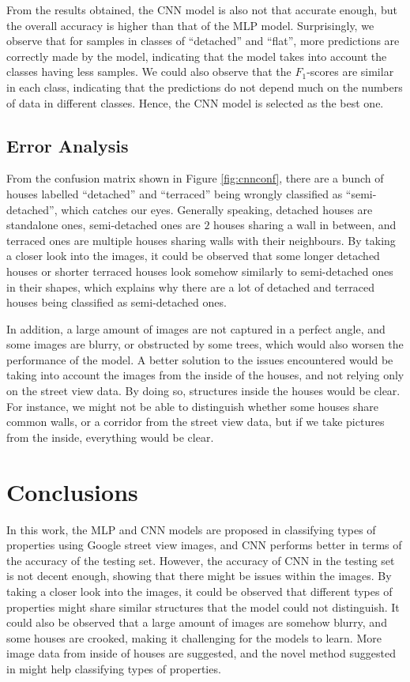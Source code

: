 \documentclass[11pt,twoside]{article}
\numberwithin{Theorem}{section}
\numberwithin{Definition}{section}
\numberwithin{Lemma}{section}
\numberwithin{Algorithm}{section}
\numberwithin{equation}{section}
\begin{document}
From the results obtained, the CNN model is also not that accurate enough, but the overall accuracy is higher than that of the MLP model. Surprisingly, we observe that for samples in classes of  “detached” and  “flat”, more predictions are correctly made by the model, indicating that the model takes into account the classes having less samples. We could also observe that the $F_1$-scores are similar in each class, indicating that the predictions do not depend much on the numbers of data in different classes. Hence, the CNN model is selected as the best one.

\subsection{Error Analysis}
From the confusion matrix shown in Figure \ref{fig:cnnconf}, there are a bunch of houses labelled “detached” and “terraced” being wrongly classified as “semi-detached”, which catches our eyes. Generally speaking, detached houses are standalone ones, semi-detached ones are $2$ houses sharing a wall in between, and terraced ones are multiple houses sharing walls with their neighbours. By taking a closer look into the images, it could be observed that some longer detached houses or shorter terraced houses look somehow similarly to semi-detached ones in their shapes, which explains why there are a lot of detached and terraced houses being classified as semi-detached ones. 

In addition, a large amount of images are not captured in a perfect angle, and some images are blurry, or obstructed by some trees, which would also worsen the performance of the model. A better solution to the issues encountered would be taking into account the images from the inside of the houses, and not relying only on the street view data. By doing so, structures inside the houses would be clear. For instance, we might not be able to distinguish whether some houses share common walls, or a corridor from the street view data, but if we take pictures from the inside, everything would be clear.

\section{Conclusions}
In this work, the MLP and CNN models are proposed in classifying types of properties using Google street view images, and CNN performs better in terms of the accuracy of the testing set. However, the accuracy of CNN in the testing set is not decent enough, showing that there might be issues within the images. By taking a closer look into the images, it could be observed that different types of properties might share similar structures that the model could not distinguish. It could also be observed that a large amount of images are somehow blurry, and some houses are crooked, making it challenging for the models to learn. More image data from inside of houses are suggested, and the novel method suggested in \cite{avelar2020superpixel} might help classifying types of properties.
\newpage


\end{document}
